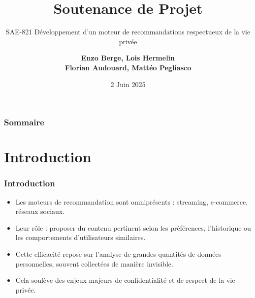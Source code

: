 \documentclass{beamer}
\title[Soutenance de Projet]{Soutenance de Projet}
\subtitle{SAE-821 Développement d’un
moteur de recommandations
respectueux de la vie privée}
\author{
    \textbf{Enzo Berge, Lois Hermelin}\\
    \textbf{Florian Audouard, Mattéo Pegliasco}
}
\institute{Université de Toulon, La Garde}
\date{2 Juin 2025}
\begin{document}
\begin{frame}
    \titlepage
\end{frame}

\begin{frame}
    \frametitle{Sommaire}
    \tableofcontents
\end{frame}

\section{Introduction}
\begin{frame}
    \frametitle{Introduction}

    \begin{itemize}
        \item Les moteurs de recommandation sont omniprésents : streaming, e-commerce, réseaux sociaux.
        
        \item Leur rôle : proposer du contenu pertinent selon les préférences, l’historique ou les comportements d’utilisateurs similaires.
        
        \item Cette efficacité repose sur l’analyse de grandes quantités de données personnelles, souvent collectées de manière invisible.

        \item Cela soulève des enjeux majeurs de confidentialité et de respect de la vie privée.
    \end{itemize}
\end{frame}

\end{document}
